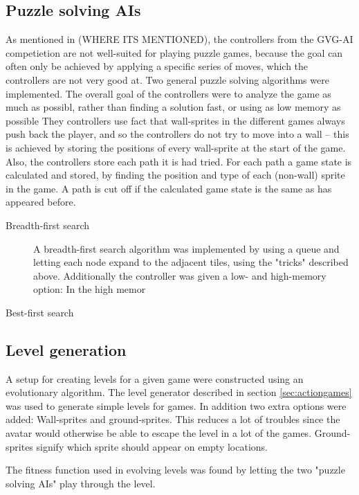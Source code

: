 \documentclass[a4paper,titlepage,final, twoside]{report}
\begin{document}
\subsection{Puzzle solving AIs} 
As mentioned in (WHERE ITS MENTIONED), the controllers from the GVG-AI competietion are not well-suited for playing puzzle games, because the goal can often only be achieved by applying a specific series of moves, which the controllers are not very good at.
Two general puzzle solving algorithms were implemented. The overall goal of the controllers were to analyze the game as much as possibl, rather than finding a solution fast, or using as low memory as possible
They controllers use fact that wall-sprites in the different games always push back the player, and so the controllers do not try to move into a wall -- this is achieved by storing the positions of every wall-sprite at the start of the game. 
Also, the controllers store each path it is had tried. For each path a game state is calculated and stored, by finding the position and type of each (non-wall) sprite in the game. A path is cut off if the calculated game state is the same as has appeared before.

\begin{description}
\item[Breadth-first search]
A breadth-first search algorithm was implemented by using a queue and letting each node expand to the adjacent tiles, using the "tricks" described above. 
Additionally the controller was given a low- and high-memory option: In the high memor

\item[Best-first search]
\end{description}


\subsection{Level generation} 
A setup for creating levels for a given game were constructed using an evolutionary algorithm. The level generator described in section \ref{sec:actiongames} was used to generate simple levels for games.  In addition two extra options were added: Wall-sprites and ground-sprites. This reduces a lot of troubles since the avatar would otherwise be able to escape the level in a lot of the games. Ground-sprites signify which sprite should appear on empty locations.

The fitness function used in evolving levels was found by letting the two "puzzle solving AIs" play through the level. 
\end{document}
